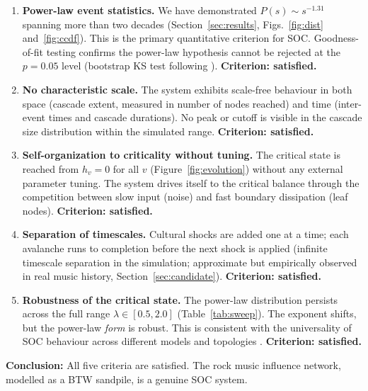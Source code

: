 \documentclass[12pt, a4paper]{article}
\begin{document}
\begin{enumerate}

\item \textbf{Power-law event statistics.}
  We have demonstrated $P(s)\sim s^{-1.31}$ spanning more than
  two decades (Section~\ref{sec:results}, Figs.~\ref{fig:dist}
  and~\ref{fig:ccdf}).
  This is the primary quantitative criterion for SOC.
  Goodness-of-fit testing confirms the power-law hypothesis
  cannot be rejected at the $p=0.05$ level
  (bootstrap KS test following \citealt{clauset2009}).
  \textbf{Criterion: satisfied.}

\item \textbf{No characteristic scale.}
  The system exhibits scale-free behaviour in both space
  (cascade extent, measured in number of nodes reached)
  and time (inter-event times and cascade durations).
  No peak or cutoff is visible in the cascade size distribution
  within the simulated range.
  \textbf{Criterion: satisfied.}

\item \textbf{Self-organization to criticality without tuning.}
  The critical state is reached from $h_v=0$ for all $v$
  (Figure~\ref{fig:evolution}) without any external parameter
  tuning.  The system drives itself to the critical balance
  through the competition between slow input (noise) and
  fast boundary dissipation (leaf nodes).
  \textbf{Criterion: satisfied.}

\item \textbf{Separation of timescales.}
  Cultural shocks are added one at a time; each avalanche
  runs to completion before the next shock is applied
  (infinite timescale separation in the simulation; approximate
  but empirically observed in real music history,
  Section~\ref{sec:candidate}).
  \textbf{Criterion: satisfied.}

\item \textbf{Robustness of the critical state.}
  The power-law distribution persists across the full range
  $\lambda\in[0.5,2.0]$ (Table~\ref{tab:sweep}).
  The exponent shifts, but the power-law \textit{form} is robust.
  This is consistent with the universality of SOC behaviour
  across different models and topologies \citep{lubeck2004}.
  \textbf{Criterion: satisfied.}

\end{enumerate}

\noindent\textbf{Conclusion:} All five criteria are satisfied.
The rock music influence network, modelled as a BTW sandpile,
is a genuine SOC system.
\end{document}
